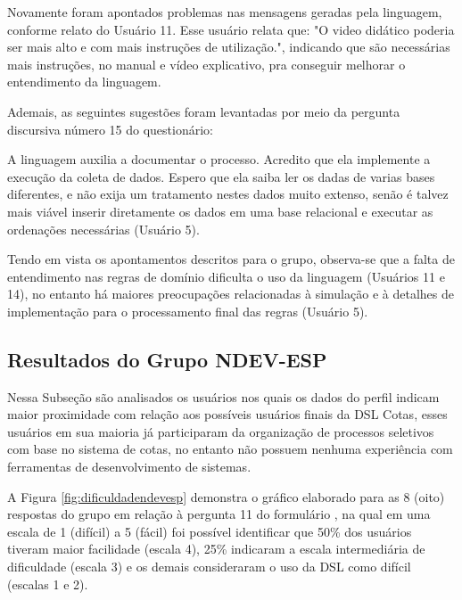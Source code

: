 Novamente foram apontados problemas nas mensagens geradas pela linguagem, conforme relato do Usuário 11. Esse usuário relata que: "O video didático poderia ser mais alto e com mais instruções de utilização.", indicando que são necessárias mais instruções, no manual e vídeo explicativo, pra conseguir melhorar o entendimento da linguagem. 

Ademais, as seguintes sugestões foram levantadas por meio da pergunta discursiva número 15 do questionário:

\begin{citacao}
A linguagem auxilia a documentar o processo. Acredito que ela implemente a execução da coleta de dados. Espero que ela saiba ler os dadas de varias bases diferentes, e não exija um tratamento nestes dados muito extenso, senão é talvez mais viável inserir diretamente os dados em uma base relacional e executar as ordenações necessárias (Usuário 5).
\end{citacao}

\newpage
Tendo em vista os apontamentos descritos para o grupo, observa-se que a falta de entendimento nas regras de domínio dificulta o uso da linguagem (Usuários 11 e 14), no entanto há maiores preocupações relacionadas à simulação e à detalhes de implementação para o processamento final das regras (Usuário 5).

\newpage
\subsection{Resultados do Grupo NDEV-ESP}
\label{subsec:devesp}

Nessa Subseção são analisados os usuários nos quais os dados do perfil indicam maior proximidade com relação aos possíveis usuários finais da DSL Cotas, esses usuários em sua maioria já participaram da organização de processos seletivos com base no sistema de cotas, no entanto não possuem nenhuma experiência com ferramentas de desenvolvimento de sistemas.

A Figura \ref{fig:dificuldadendevesp} demonstra o gráfico elaborado para as 8 (oito) respostas do grupo em relação à pergunta 11 do formulário , na qual em uma escala de 1 (difícil) a 5 (fácil) foi possível identificar que 50\% dos usuários tiveram maior facilidade (escala 4), 25\% indicaram a escala intermediária de dificuldade (escala 3) e os demais consideraram o uso da DSL como difícil (escalas 1 e 2). 



